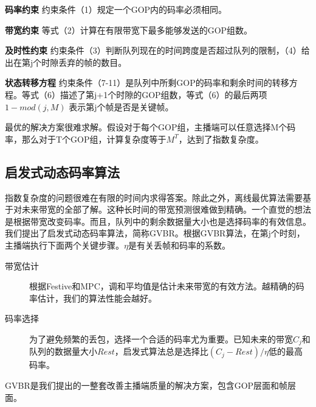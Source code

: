 \textbf{码率约束} 约束条件（1）规定一个GOP内的码率必须相同。

\textbf{带宽约束} 等式（2）计算在有限带宽下最多能够发送的GOP组数。

\textbf{及时性约束} 约束条件（3）判断队列现在的时间跨度是否超过队列的限制，（4）给出在第j个时隙丢弃的帧的数目。

\textbf{状态转移方程} 约束条件（7-11）是队列中所剩GOP的码率和剩余时间的转移方程。等式（6）描述了第j+1个时隙的GOP组数，等式（6）的最后两项 $1-mod(j,M)$ 表示第j个帧是否是关键帧。

最优的解决方案很难求解。假设对于每个GOP组，主播端可以任意选择M个码率，那么对于T个GOP组，计算复杂度等于$M^T$，达到了指数复杂度。

\subsection{启发式动态码率算法}
指数复杂度的问题很难在有限的时间内求得答案。除此之外，离线最优算法需要基于对未来带宽的全部了解。这种长时间的带宽预测很难做到精确。一个直觉的想法是根据带宽改变码率。而且，队列中的剩余数据量大小也是选择码率的有效信息。我们提出了启发式动态码率算法，简称GVBR。根据GVBR算法，在第j个时刻，主播端执行下面两个关键步骤。$\eta$是有关丢帧和码率的系数。

\begin{description}
  \item[带宽估计] 根据Festive和MPC，调和平均值是估计未来带宽的有效方法。越精确的码率估计，我们的算法性能会越好。
  \item[码率选择] 为了避免频繁的丢包，选择一个合适的码率尤为重要。已知未来的带宽$C_j$和队列的数据量大小$Rest$，启发式算法总是选择比$(C_j-Rest)/\eta$低的最高码率。
\end{description}

GVBR是我们提出的一整套改善主播端质量的解决方案，包含GOP层面和帧层面。
